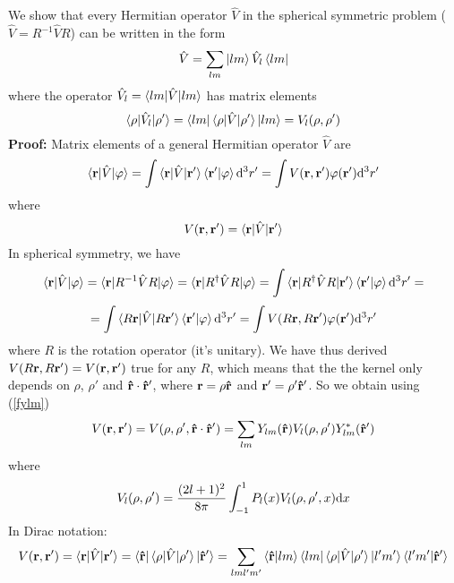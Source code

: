 We show that every Hermitian operator $\hat V$ in the spherical symmetric problem ($\hat V=R^{-1}\hat VR$) can be written in the form 
\begin{equation}
  \hat V=\sum_{lm}\mathinner{|{lm}\rangle}\hat V_l\mathinner{\langle{lm}|}  \label{lmexpansion}
\end{equation}
where the operator $\hat V_l=\mathinner{\langle{lm|\hat V|lm}\rangle}$ has matrix elements 
\begin{equation*}
  \mathinner{\langle{\rho|\hat V_l|\rho'}\rangle}=\mathinner{\langle{lm}|}\mathinner{\langle{\rho|\hat V|\rho'}\rangle}\mathinner{|{lm}\rangle}= V_l(\rho,\rho')
\end{equation*}
{\bf Proof:} Matrix elements of a general Hermitian operator $\hat V$ are 
\begin{equation*}
  \mathinner{\langle{{\bf r}|\hat V|\varphi}\rangle}= \int\mathinner{\langle{{\bf r}|\hat V|{\bf r'}}\rangle}\mathinner{\langle{{\bf r'}|\varphi}\rangle}{\rm d}^3r'= \int V({\bf r},{\bf r'})\varphi({\bf r'}){\rm d}^3r'
\end{equation*}
where 
\begin{equation*}
  V({\bf r}, {\bf r'})=\mathinner{\langle{{\bf r}|\hat V|{\bf r'}}\rangle}
\end{equation*}
In spherical symmetry, we have 
\begin{equation*}
  \mathinner{\langle{{\bf r}|\hat V|\varphi}\rangle} =\mathinner{\langle{{\bf r}|R^{-1}\hat VR|\varphi}\rangle} =\mathinner{\langle{{\bf r}|R^{\dagger}\hat VR|\varphi}\rangle} =\int\mathinner{\langle{{\bf r}|R^{\dagger}\hat VR|{\bf r'}}\rangle}\mathinner{\langle{{\bf r'}|\varphi}\rangle}{\rm d}^3r' =
\end{equation*}
\begin{equation*}
  =\int\mathinner{\langle{R{\bf r}|\hat V|R{\bf r'}}\rangle}\mathinner{\langle{{\bf r'}|\varphi}\rangle}{\rm d}^3r' =\int V(R{\bf r},R{\bf r'})\varphi({\bf r'}){\rm d}^3r'
\end{equation*}
where $R$ is the rotation operator (it's unitary). We have thus derived $V(R{\bf r},R{\bf r'})=V({\bf r},{\bf r'})$ true for any $R$, which means that the the kernel only depends on $\rho$, $\rho'$ and ${\bf\hat r}\cdot{\bf\hat r'}$, where ${\bf r}=\rho{\bf\hat r}$ and ${\bf r'}=\rho'{\bf\hat r'}$. So we obtain using (\ref{fylm})
\begin{equation*}
  V({\bf r}, {\bf r'})=V(\rho,\rho',{\bf\hat r}\cdot{\bf\hat r'})= \sum_{lm} Y_{lm}({\bf\hat r}) V_l(\rho,\rho') Y_{lm}^*({\bf\hat r'})
\end{equation*}
where 
\begin{equation*}
  V_l(\rho,\rho')={(2l+1)^2\over8\pi}\int_{-1}^1 P_l(x)V_l(\rho,\rho',x){\rm d} x
\end{equation*}
In Dirac notation: 
\begin{equation*}
  V({\bf r}, {\bf r'})=\mathinner{\langle{{\bf r}|\hat V|{\bf r'}}\rangle} =\mathinner{\langle{\bf\hat r}|}\mathinner{\langle{\rho|\hat V|\rho'}\rangle}\mathinner{|{\bf\hat r'}\rangle} =\sum_{lml'm'}\mathinner{\langle{{\bf\hat r}|lm}\rangle}\mathinner{\langle{lm}|}\mathinner{\langle{\rho|\hat V|\rho'}\rangle} \mathinner{|{l'm'}\rangle}\mathinner{\langle{l'm'|\bf\hat r'}\rangle}
\end{equation*}
